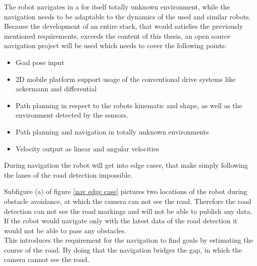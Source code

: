 The robot navigates in a for itself totally unknown environment, while the navigation needs to be adaptable to the dynamics of the used and similar robots. Because the development of an entire stack, that would satisfies the previously mentioned requirements, exceeds the content of this thesis, an open source navigation project will be used which needs to cover the following points:
\begin{itemize}
	\item Goal pose input
	\item 2D mobile platform support usage of the conventional drive systems like ackermann and differential
	\item Path planning in respect to the robots kinematic and shape, as well as the environment detected by the sensors.
	\item Path planning and navigation in totally unknown environments
	\item Velocity output as linear and angular velocities
\end{itemize}

During navigation the robot will get into edge cases, that make simply following the lanes of the road detection impossible. 

Subfigure (a) of figure \ref{nav edge case} pictures two locations of the robot during obstacle avoidance, at which the camera can not see the road. Therefore the road detection can not see the road markings and will not be able to publish any data. If the robot would navigate only with the latest data of the road detection it would not be able to pass any obstacles.\\
This introduces the requirement for the navigation to find goals by estimating the course of the road. By doing that the navigation bridges the gap, in which the camera cannot see the road.\\

